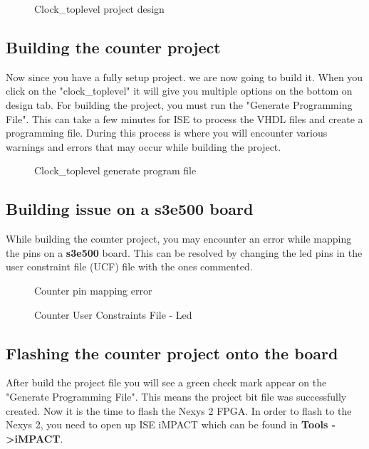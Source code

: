 \documentclass{article}
\begin{document}
\begin{figure}[!htb]
  \centering
  \caption{Clock\_toplevel project design}
\end{figure}

\subsection{Building the counter project}
Now since you have a fully setup project. we are now going to build it. When you click on the "clock\_toplevel" it will give you multiple options on the bottom on design tab. For building the project, you must run the "Generate Programming File". This can take a few minutes for ISE to process the VHDL files and create a programming file. During this process is where you will encounter various warnings and errors that may occur while building the project.

\begin{figure}[!htb]
  \centering
  \caption{Clock\_toplevel generate program file}
\end{figure}

\subsection{Building issue on a s3e500 board}
While building the counter project, you may encounter an error while mapping the pins on a \textbf{s3e500} board. This can be resolved by changing the led pins in the user constraint file (UCF) file with the ones commented.

\begin{figure}[!htb]
  \centering
  \caption{Counter pin mapping error}
\end{figure}

\begin{figure}[!htb]
  \centering
  \caption{Counter User Constraints File - Led}
\end{figure}

\subsection{Flashing the counter project onto the board}
After build the project file you will see a green check mark appear on the "Generate Programming File". This means the project bit file was successfully created. Now it is the time to flash the Nexys 2 FPGA. In order to flash to the Nexys 2, you need to open up ISE iMPACT which can be found in \textbf{Tools -\textgreater iMPACT}.
\end{document}
